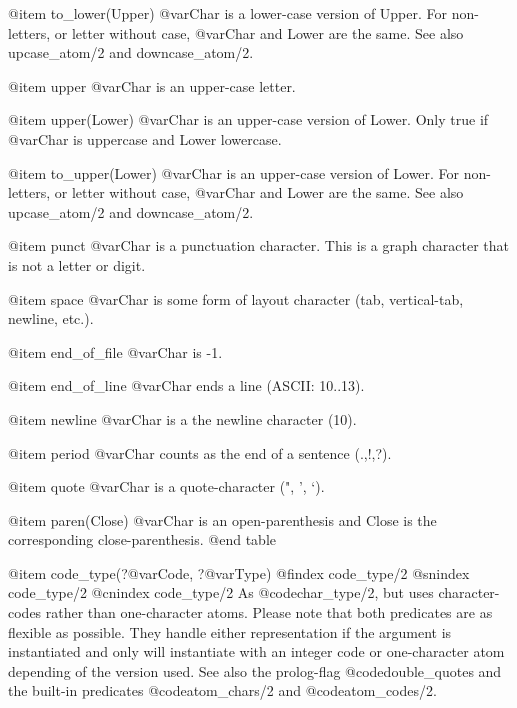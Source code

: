 {{{{@item    to_lower(Upper)
        @var{Char} is a lower-case version of Upper. For non-letters, or letter without case, @var{Char} and Lower are the same. See also upcase_atom/2 and downcase_atom/2.

@item    upper
        @var{Char} is an upper-case letter.

@item    upper(Lower)
        @var{Char} is an upper-case version of Lower. Only true if @var{Char} is uppercase and Lower lowercase.

@item    to_upper(Lower)
        @var{Char} is an upper-case version of Lower. For non-letters, or letter without case, @var{Char} and Lower are the same. See also upcase_atom/2 and downcase_atom/2.

@item    punct
        @var{Char} is a punctuation character. This is a graph character that is not a letter or digit.

@item    space
        @var{Char} is some form of layout character (tab, vertical-tab, newline, etc.).

@item    end_of_file
        @var{Char} is -1.

@item    end_of_line
        @var{Char} ends a line (ASCII: 10..13).

@item    newline
        @var{Char} is a the newline character (10).

@item    period
        @var{Char} counts as the end of a sentence (.,!,?).

@item    quote
        @var{Char} is a quote-character (", ', `).

@item    paren(Close)
        @var{Char} is an open-parenthesis and Close is the corresponding close-parenthesis. 
@end table

@item code_type(?@var{Code}, ?@var{Type})
@findex code_type/2
@snindex code_type/2
@cnindex code_type/2
    As @code{char_type/2}, but uses character-codes rather than
    one-character atoms. Please note that both predicates are as
    flexible as possible. They handle either representation if the
    argument is instantiated and only will instantiate with an integer
    code or one-character atom depending of the version used. See also
    the prolog-flag @code{double_quotes} and the built-in predicates 
    @code{atom_chars/2} and @code{atom_codes/2}.

@end table

@node Comparing Terms, Arithmetic, Predicates on Characters, Top
@section Comparing Terms

The following predicates are used to compare and order terms, using the
standard ordering:

}}}}

